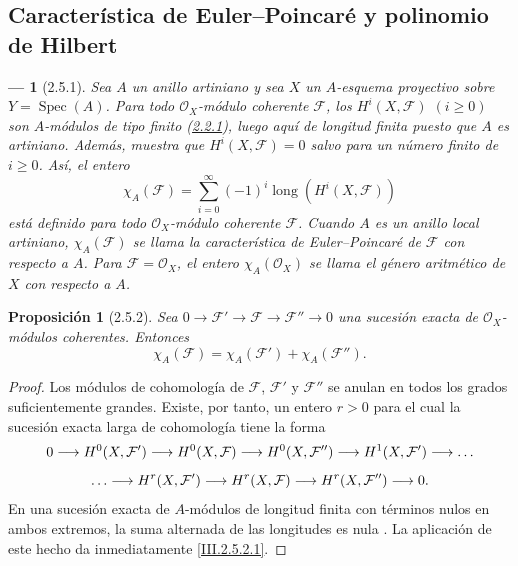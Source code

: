 \documentclass[10pt,oneside,openany]{book}
\theoremstyle{egaenv}\newtheorem*{env}{---}
\theoremstyle{egastatement}
\newtheorem*{proposition}{Proposición}
\theoremstyle{egadescription}
\renewcommand{\geq}{\geqslant}
\renewcommand{\to}{\mathchoice{\longrightarrow}{\rightarrow}{\rightarrow}{\rightarrow}}
\begin{document}
\subsection{Característica de Euler--Poincar\'e y polinomio de Hilbert}
\label{subsection:III.2.5}
\label{subsection:III.2.5-fr}

\begin{env}[2.5.1]
\label{III.2.5.1}
\label{III.2.5.1-fr}
Sea $A$ un anillo \emph{artiniano} y sea $X$ un $A$-esquema \emph{proyectivo} sobre
$Y=\operatorname{Spec}(A)$.
Para todo $\mathcal O_X$-módulo coherente $\mathcal F$, los $H^i(X,\mathcal F)$ $(i\geq0)$ son $A$-módulos de
tipo finito (\hyperref[III.2.2.1-fr]{2.2.1}), luego aquí \emph{de longitud finita}
puesto que $A$ es artiniano.
Además,  muestra que $H^i(X,\mathcal F)=0$ salvo para un número finito de $i\geq0$.
Así, el entero
\[
\chi_A(\mathcal F)=\sum_{i=0}^{\infty}(-1)^i
\operatorname{long}(H^i(X,\mathcal F))
\tag{2.5.1.1}\label{III.2.5.1.1-fr}
\]
está definido para todo $\mathcal O_X$-módulo coherente $\mathcal F$.
Cuando $A$ es un \emph{anillo local artiniano}, $\chi_A(\mathcal F)$ se llama la \emph{característica de Euler--Poincar\'e de} $\mathcal F$ \emph{con respecto a} $A$.
Para $\mathcal F=\mathcal O_X$, el entero $\chi_A(\mathcal O_X)$ se llama el \emph{género aritmético de} $X$ con respecto a $A$.
\end{env}

\begin{proposition}[2.5.2]
\label{III.2.5.2}
\label{III.2.5.2-fr}
Sea
$0\longrightarrow\mathcal F'\longrightarrow\mathcal F
\longrightarrow\mathcal F''\longrightarrow0$
una sucesión exacta de $\mathcal O_X$-módulos coherentes.
Entonces
\[
\chi_A(\mathcal F)=\chi_A(\mathcal F')+\chi_A(\mathcal F'').
\tag{2.5.2.1}\label{III.2.5.2.1-fr}
\]
\end{proposition}

\begin{proof}
Los módulos de cohomología de $\mathcal F$, $\mathcal F'$ y $\mathcal F''$ se anulan en todos los grados suficientemente grandes.
Existe, por tanto, un entero $r>0$ para el cual la sucesión exacta larga de cohomología tiene la forma
\[
0\to H^0(X,\mathcal F')\to H^0(X,\mathcal F)
\to H^0(X,\mathcal F'')\to H^1(X,\mathcal F')\to\ldots
\]
\[
\ldots\to H^r(X,\mathcal F')\to H^r(X,\mathcal F)
\to H^r(X,\mathcal F'')\to0.
\]
En una sucesión exacta de $A$-módulos de longitud finita con términos nulos en ambos extremos, la suma alternada de las longitudes es nula .
La aplicación de este hecho da inmediatamente \eqref{III.2.5.2.1}.
\end{proof}
\end{document}

